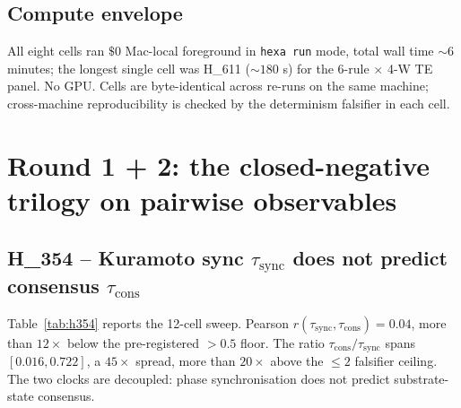 \documentclass[11pt,a4paper]{article}
\begin{document}
\subsection{Compute envelope}

All eight cells ran $\$0$ Mac-local foreground in
\texttt{hexa run} mode, total wall time $\sim 6$ minutes; the
longest single cell was H\_611 ($\sim 180$ s) for the 6-rule
$\times$ 4-W TE panel. No GPU. Cells are byte-identical across
re-runs on the same machine; cross-machine reproducibility is
checked by the determinism falsifier in each cell.

\section{Round 1 + 2: the closed-negative trilogy on pairwise observables}
\label{sec:closed-neg}

\subsection{H\_354 -- Kuramoto sync $\tau_{\mathrm{sync}}$ does not predict consensus $\tau_{\mathrm{cons}}$}
\label{sec:h354}

Table~\ref{tab:h354} reports the 12-cell sweep. Pearson
$r(\tau_{\mathrm{sync}}, \tau_{\mathrm{cons}}) = 0.04$, more than
$12\times$ below the pre-registered $> 0.5$ floor. The ratio
$\tau_{\mathrm{cons}}/\tau_{\mathrm{sync}}$ spans
$[0.016, 0.722]$, a $45\times$ spread, more than $20\times$ above the
$\leq 2$ falsifier ceiling. The two clocks are decoupled: phase
synchronisation does not predict substrate-state consensus.
\end{document}
